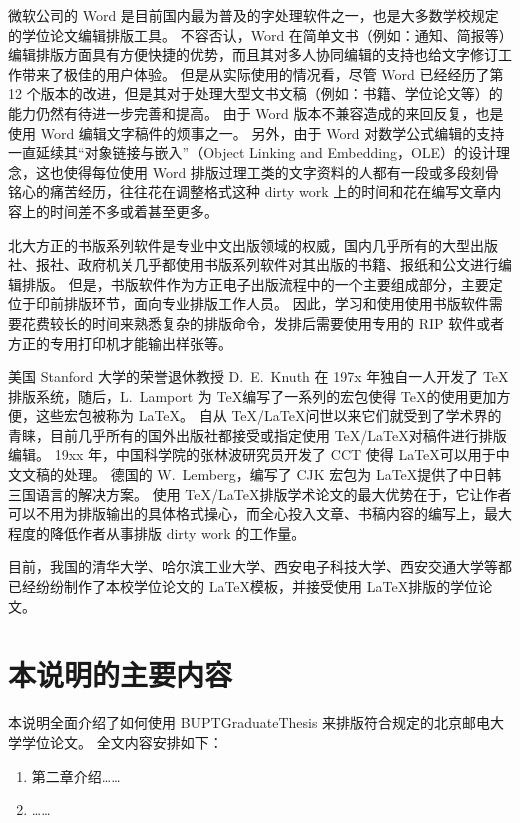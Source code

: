 微软公司的 Word 是目前国内最为普及的字处理软件之一，也是大多数学校规定的学位论文编辑排版工具。
不容否认，Word 在简单文书（例如：通知、简报等）编辑排版方面具有方便快捷的优势，而且其对多人协同编辑的支持也给文字修订工作带来了极佳的用户体验。
但是从实际使用的情况看，尽管 Word 已经经历了第 12 个版本的改进，但是其对于处理大型文书文稿（例如：书籍、学位论文等）的能力仍然有待进一步完善和提高。
由于 Word 版本不兼容造成的来回反复，也是使用 Word 编辑文字稿件的烦事之一。
另外，由于 Word 对数学公式编辑的支持一直延续其“对象链接与嵌入”（Object Linking and Embedding，OLE）的设计理念，这也使得每位使用 Word 排版过理工类的文字资料的人都有一段或多段刻骨铭心的痛苦经历，往往花在调整格式这种 dirty work 上的时间和花在编写文章内容上的时间差不多或着甚至更多。

北大方正的书版系列软件是专业中文出版领域的权威，国内几乎所有的大型出版社、报社、政府机关几乎都使用书版系列软件对其出版的书籍、报纸和公文进行编辑排版。
但是，书版软件作为方正电子出版流程中的一个主要组成部分，主要定位于印前排版环节，面向专业排版工作人员。
因此，学习和使用使用书版软件需要花费较长的时间来熟悉复杂的排版命令，发排后需要使用专用的 RIP 软件或者方正的专用打印机才能输出样张等。

美国 Stanford 大学的荣誉退休教授 D.~E.~Knuth 在 197x 年独自一人开发了 \TeX 排版系统，随后，L.~Lamport 为 \TeX 编写了一系列的宏包使得 \TeX 的使用更加方便，这些宏包被称为 \LaTeX。
自从 \TeX/\LaTeX 问世以来它们就受到了学术界的青睐，目前几乎所有的国外出版社都接受或指定使用 \TeX/\LaTeX 对稿件进行排版编辑。
19xx 年，中国科学院的张林波研究员开发了 CCT 使得 \LaTeX 可以用于中文文稿的处理。
德国的 W.~Lemberg，编写了 CJK 宏包为 \LaTeX 提供了中日韩三国语言的解决方案。
使用 \TeX/\LaTeX 排版学术论文的最大优势在于，它让作者可以不用为排版输出的具体格式操心，而全心投入文章、书稿内容的编写上，最大程度的降低作者从事排版 dirty work 的工作量。

目前，我国的清华大学、哈尔滨工业大学、西安电子科技大学、西安交通大学等都已经纷纷制作了本校学位论文的 \LaTeX 模板，并接受使用 \LaTeX 排版的学位论文。

\section{本说明的主要内容}
本说明全面介绍了如何使用 BUPTGraduateThesis 来排版符合规定的北京邮电大学学位论文。
全文内容安排如下：

\begin{enumerate}
\item 第二章介绍……
\item ……
\end{enumerate}

\ifx\usechapbib\empty
\nocite{BSTcontrol}
\setcounter{NAT@ctr}{0}


\fi
